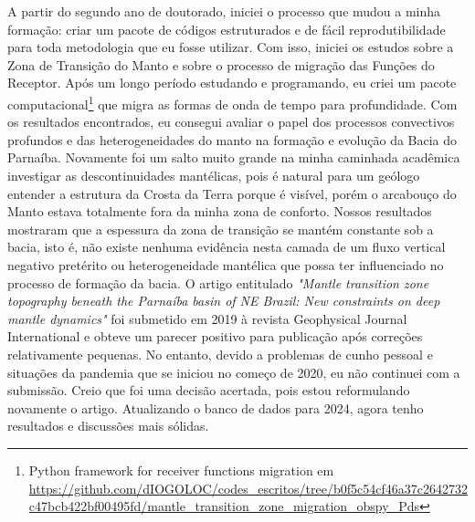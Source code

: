 \documentclass[10pt,a4paper,oneside]{book}
\begin{document}
A partir do segundo ano de doutorado, iniciei o processo que mudou a minha formação: criar um pacote de códigos estruturados e de fácil reprodutibilidade para toda metodologia que eu fosse utilizar. Com isso, iniciei os estudos sobre a Zona de Transição do Manto e sobre o processo de migração das Funções do Receptor. Após um longo período estudando e programando, eu criei um pacote computacional\footnote{Python framework for receiver functions migration em \url{https://github.com/dIOGOLOC/codes_escritos/tree/b0f5c54cf46a37c2642732c47bcb422bf00495fd/mantle_transition_zone_migration_obspy_Pds}} que migra as formas de onda de tempo para profundidade. Com os resultados encontrados, eu consegui avaliar o papel dos processos convectivos profundos e das heterogeneidades do manto na formação e evolução da Bacia do Parnaíba. Novamente foi um salto muito grande na minha caminhada acadêmica investigar as descontinuidades mantélicas, pois é natural para um geólogo entender a estrutura da Crosta da Terra porque é visível, porém o arcabouço do Manto estava totalmente fora da minha zona de conforto. Nossos resultados mostraram que a espessura da zona de transição se mantém constante sob a bacia, isto é, não existe nenhuma evidência nesta camada de um fluxo vertical negativo pretérito ou heterogeneidade mantélica que possa ter influenciado no processo de formação da bacia. O artigo entitulado \textit{"Mantle transition zone topography beneath the Parnaíba basin of NE Brazil: New constraints on deep mantle dynamics"} foi submetido em 2019 à revista Geophysical Journal International e obteve um parecer positivo para publicação após correções relativamente pequenas. No entanto, devido a problemas de cunho pessoal e situações da pandemia que se iniciou no começo de 2020, eu não continuei com a submissão. Creio que foi uma decisão acertada, pois estou reformulando novamente o artigo. Atualizando o banco de dados para 2024, agora tenho resultados e discussões mais sólidas.

\bigskip
\end{document}
